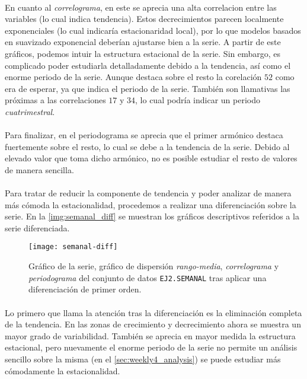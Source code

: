 \documentclass[a4paper, spanish]{article}
\begin{document}
      \paragraph{}
      En cuanto al \emph{correlograma}, en este se aprecia una alta correlacion entre las variables (lo cual indica tendencia). Estos decrecimientos parecen localmente exponenciales (lo cual indicaría estacionaridad local), por lo que modelos basados en suavizado exponencial deberían ajustarse bien a la serie. A partir de este gráficos, podemos intuir la estructura estacional de la serie. Sin embargo, es complicado poder estudiarla detalladamente debido a la tendencia, así como el enorme periodo de la serie. Aunque destaca sobre el resto la corelación $52$ como era de esperar, ya que indica el periodo de la serie. También son llamativas las próximas a las correlaciones $17$ y $34$, lo cual podría indicar un periodo \emph{cuatrimestral}.

      \paragraph{}
      Para finalizar, en el periodograma se aprecia que el primer armónico destaca fuertemente sobre el resto, lo cual se debe a la tendencia de la serie. Debido al elevado valor que toma dicho armónico, no es posible estudiar el resto de valores de manera sencilla.

      \paragraph{}
      Para tratar de reducir la componente de tendencia y poder analizar de manera más cómoda la estacionalidad, procedemos a realizar una diferenciación sobre la serie. En la \autoref{img:semanal_diff} se muestran los gráficos descriptivos referidos a la serie diferenciada.

      \begin{figure}[htb!]
        \centering
        \texttt{[image: semanal-diff]}
        \caption{Gráfico de la serie, gráfico de dispersión \emph{rango-media}, \emph{correlograma} y \emph{periodograma} del conjunto de datos \texttt{EJ2.SEMANAL} tras aplicar una diferenciación de primer orden.}
        \label{img:semanal_diff}
      \end{figure}

      \paragraph{}
      Lo primero que llama la atención tras la diferenciación es la eliminación completa de la tendencia. En las zonas de crecimiento y decrecimiento ahora se muestra un mayor grado de variabilidad. También se aprecia en mayor medida la estructura estacional, pero nuevamente el enorme periodo de la serie no permite un análisis sencillo sobre la misma (en el \autoref{sec:weekly4_analysis}) se puede estudiar más cómodamente la estacionalidad.
\end{document}
